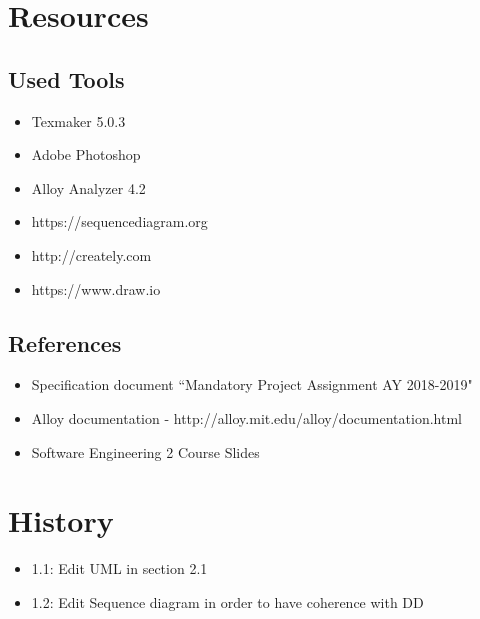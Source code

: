 \documentclass{article}
\begin{document}
\section{Resources}
\subsection{Used Tools}
\begin{itemize}
\item Texmaker 5.0.3
\item Adobe Photoshop
\item Alloy Analyzer 4.2
\item https://sequencediagram.org
\item http://creately.com
\item https://www.draw.io
\end{itemize}
\subsection{References}
\begin{itemize}
\item Specification document “Mandatory Project Assignment AY 2018-2019"
\item Alloy documentation - http://alloy.mit.edu/alloy/documentation.html
\item Software Engineering 2 Course Slides
\end{itemize}
\newpage
\section{ History}
\begin{itemize}
\item 1.1: Edit UML in section 2.1
\item 1.2: Edit Sequence diagram in order to have coherence with DD
\end{itemize}
\end{document}
